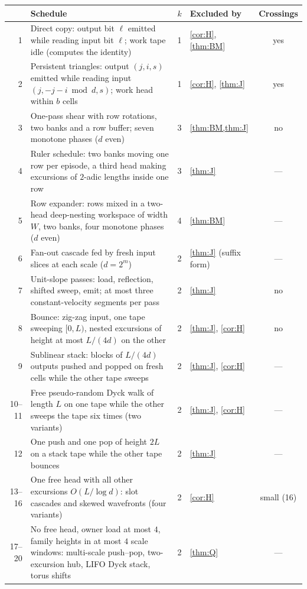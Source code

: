 {\small
\begin{longtable}{@{}r p{} c p{} c@{}}
\toprule
& Schedule & $k$ & Excluded by & Crossings \\
\midrule
\endhead
1 & Direct copy: output bit $\ell$ emitted while reading input bit $\ell$; work tape idle (computes the identity) & 1 & \cref{cor:H}, \cref{thm:BM} & yes \\
2 & Persistent triangles: output $(j,i,s)$ emitted while reading input $(j,-j-i\bmod d,s)$; work head within $b$ cells & 1 & \cref{cor:H}, \cref{thm:J} & yes \\
3 & One-pass shear with row rotations, two banks and a row buffer; seven monotone phases ($d$ even) & 3 & \cref{thm:BM,thm:J} & no \\
4 & Ruler schedule: two banks moving one row per episode, a third head making excursions of $2$-adic lengths inside one row & 3 & \cref{thm:J} & --- \\
5 & Row expander: rows mixed in a two-head deep-nesting workspace of width $W$, two banks, four monotone phases ($d$ even) & 4 & \cref{thm:BM} & --- \\
6 & Fan-out cascade fed by fresh input slices at each scale ($d=2^m$) & 2 & \cref{thm:J} (suffix form) & --- \\
7 & Unit-slope passes: load, reflection, shifted sweep, emit; at most three constant-velocity segments per pass & 2 & \cref{thm:J} & no \\
8 & Bounce: zig-zag input, one tape sweeping $[0,L)$, nested excursions of height at most $L/(4d)$ on the other & 2 & \cref{thm:J}, \cref{cor:H} & no \\
9 & Sublinear stack: blocks of $L/(4d)$ outputs pushed and popped on fresh cells while the other tape sweeps & 2 & \cref{thm:J}, \cref{cor:H} & --- \\
10--11 & Free pseudo-random Dyck walk of length $L$ on one tape while the other sweeps the tape six times (two variants) & 2 & \cref{thm:J}, \cref{cor:H} & --- \\
12 & One push and one pop of height $2L$ on a stack tape while the other tape bounces & 2 & \cref{thm:J} & --- \\
13--16 & One free head with all other excursions $O(L/\log d)$: slot cascades and skewed wavefronts (four variants) & 2 & \cref{cor:H} & small (16) \\
17--20 & No free head, owner load at most $4$, family heights in at most $4$ scale windows: multi-scale push--pop, two-excursion hub, LIFO Dyck stack, torus shifts & 2 & \cref{thm:Q} & --- \\

\end{longtable}}
